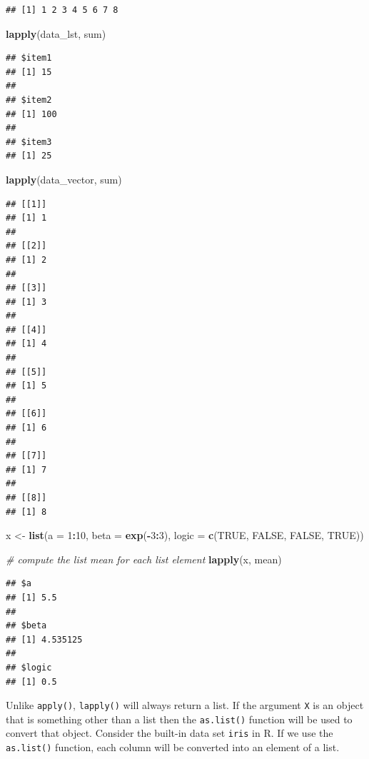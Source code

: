 \documentclass[
]{book}
\newenvironment{Shaded}{\begin{snugshade}}{\end{snugshade}}
\newcommand{\CommentTok}[1]{\textcolor[rgb]{0.56,0.35,0.01}{\textit{#1}}}
\newcommand{\DataTypeTok}[1]{\textcolor[rgb]{0.13,0.29,0.53}{#1}}
\newcommand{\DecValTok}[1]{\textcolor[rgb]{0.00,0.00,0.81}{#1}}
\newcommand{\KeywordTok}[1]{\textcolor[rgb]{0.13,0.29,0.53}{\textbf{#1}}}
\newcommand{\NormalTok}[1]{#1}
\newcommand{\OperatorTok}[1]{\textcolor[rgb]{0.81,0.36,0.00}{\textbf{#1}}}
\newcommand{\OtherTok}[1]{\textcolor[rgb]{0.56,0.35,0.01}{#1}}
\newcommand{\StringTok}[1]{\textcolor[rgb]{0.31,0.60,0.02}{#1}}
\begin{document}
\begin{verbatim}
## [1] 1 2 3 4 5 6 7 8
\end{verbatim}

\begin{Shaded}
\begin{Highlighting}[]
\KeywordTok{lapply}\NormalTok{(data_lst, sum)}
\end{Highlighting}
\end{Shaded}

\begin{verbatim}
## $item1
## [1] 15
## 
## $item2
## [1] 100
## 
## $item3
## [1] 25
\end{verbatim}

\begin{Shaded}
\begin{Highlighting}[]
\KeywordTok{lapply}\NormalTok{(data_vector, sum)}
\end{Highlighting}
\end{Shaded}

\begin{verbatim}
## [[1]]
## [1] 1
## 
## [[2]]
## [1] 2
## 
## [[3]]
## [1] 3
## 
## [[4]]
## [1] 4
## 
## [[5]]
## [1] 5
## 
## [[6]]
## [1] 6
## 
## [[7]]
## [1] 7
## 
## [[8]]
## [1] 8
\end{verbatim}

\begin{Shaded}
\begin{Highlighting}[]
\NormalTok{x <-}\StringTok{ }\KeywordTok{list}\NormalTok{(}\DataTypeTok{a =} \DecValTok{1}\OperatorTok{:}\DecValTok{10}\NormalTok{, }\DataTypeTok{beta =} \KeywordTok{exp}\NormalTok{(}\OperatorTok{-}\DecValTok{3}\OperatorTok{:}\DecValTok{3}\NormalTok{), }\DataTypeTok{logic =} \KeywordTok{c}\NormalTok{(}\OtherTok{TRUE}\NormalTok{, }\OtherTok{FALSE}\NormalTok{,}
    \OtherTok{FALSE}\NormalTok{, }\OtherTok{TRUE}\NormalTok{))}

\CommentTok{# compute the list mean for each list element}
\KeywordTok{lapply}\NormalTok{(x, mean)}
\end{Highlighting}
\end{Shaded}

\begin{verbatim}
## $a
## [1] 5.5
## 
## $beta
## [1] 4.535125
## 
## $logic
## [1] 0.5
\end{verbatim}

Unlike \texttt{apply()}, \texttt{lapply()} will always return a list. If the argument \texttt{X} is an object that is something other than a list then the \texttt{as.list()} function will be used to convert that object. Consider the built-in data set \texttt{iris} in R. If we use the \texttt{as.list()} function, each column will be converted into an element of a list.
\end{document}
